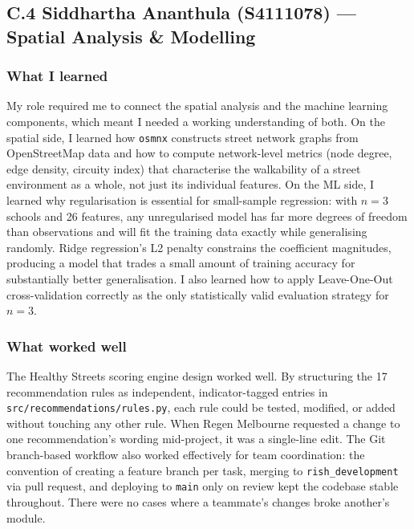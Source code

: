 \documentclass[11pt,a4paper]{article}
\begin{document}
\bigskip
\subsection*{C.4 Siddhartha Ananthula (S4111078) — Spatial Analysis \& Modelling}

\subsubsection*{What I learned}
My role required me to connect the spatial analysis and the machine learning components, which meant I needed a working understanding of both. On the spatial side, I learned how \texttt{osmnx} constructs street network graphs from OpenStreetMap data and how to compute network-level metrics (node degree, edge density, circuity index) that characterise the walkability of a street environment as a whole, not just its individual features. On the ML side, I learned why regularisation is essential for small-sample regression: with $n=3$ schools and 26 features, any unregularised model has far more degrees of freedom than observations and will fit the training data exactly while generalising randomly. Ridge regression's L2 penalty constrains the coefficient magnitudes, producing a model that trades a small amount of training accuracy for substantially better generalisation. I also learned how to apply Leave-One-Out cross-validation correctly as the only statistically valid evaluation strategy for $n=3$.

\subsubsection*{What worked well}
The Healthy Streets scoring engine design worked well. By structuring the 17 recommendation rules as independent, indicator-tagged entries in \texttt{src/recommendations/rules.py}, each rule could be tested, modified, or added without touching any other rule. When Regen Melbourne requested a change to one recommendation's wording mid-project, it was a single-line edit. The Git branch-based workflow also worked effectively for team coordination: the convention of creating a feature branch per task, merging to \texttt{rish\_development} via pull request, and deploying to \texttt{main} only on review kept the codebase stable throughout. There were no cases where a teammate's changes broke another's module.
\end{document}
